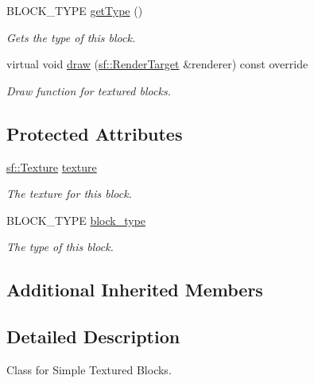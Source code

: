 \begin{DoxyCompactItemize}
B\+L\+O\+C\+K\+\_\+\+T\+Y\+PE \mbox{\hyperlink{class_textured_block_a22e6287e0876e90699c0f1f4f59f7d8e}{get\+Type}} ()
\begin{DoxyCompactList}\small\item\em Gets the type of this block. \end{DoxyCompactList}\item 
virtual void \mbox{\hyperlink{class_textured_block_a2c8d3fa594f02632bba0c7d54909c988}{draw}} (\mbox{\hyperlink{classsf_1_1_render_target}{sf\+::\+Render\+Target}} \&renderer) const override
\begin{DoxyCompactList}\small\item\em Draw function for textured blocks. \end{DoxyCompactList}\end{DoxyCompactItemize}
\subsection*{Protected Attributes}
\begin{DoxyCompactItemize}
\item 
\mbox{\label{class_textured_block_aac8695f8386a144ebb2aede42ae1c10f}} 
\mbox{\hyperlink{classsf_1_1_texture}{sf\+::\+Texture}} \mbox{\hyperlink{class_textured_block_aac8695f8386a144ebb2aede42ae1c10f}{texture}}
\begin{DoxyCompactList}\small\item\em The texture for this block. \end{DoxyCompactList}\item 
\mbox{\label{class_textured_block_a0b07e70cd1c4206cc17eb46977aecffb}} 
B\+L\+O\+C\+K\+\_\+\+T\+Y\+PE \mbox{\hyperlink{class_textured_block_a0b07e70cd1c4206cc17eb46977aecffb}{block\+\_\+type}}
\begin{DoxyCompactList}\small\item\em The type of this block. \end{DoxyCompactList}\end{DoxyCompactItemize}
\subsection*{Additional Inherited Members}


\subsection{Detailed Description}
Class for Simple Textured Blocks. 

